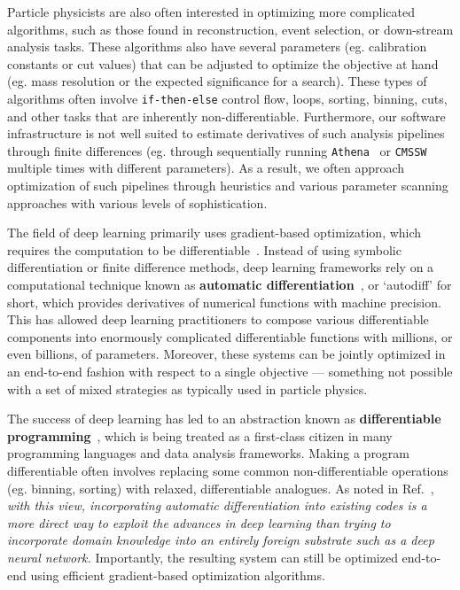 \documentclass{article}
\begin{document}
Particle physicists are also often interested in optimizing more complicated algorithms, such as those found in reconstruction, event selection, or down-stream analysis tasks. These algorithms also have several parameters (eg. calibration constants or cut values) that can be adjusted to optimize the objective at hand (eg. mass resolution or the expected significance for a search). These types of algorithms often involve \texttt{if-then-else} control flow, loops, sorting, binning, cuts, and other tasks that are inherently non-differentiable. Furthermore, our software infrastructure is not well suited to estimate derivatives of such analysis pipelines through finite differences (eg. through sequentially running \texttt{Athena}~\cite{Athena} or \texttt{CMSSW}~\cite{CMSSW} multiple times with different parameters). As a result, we often approach optimization of such pipelines  through heuristics and various parameter scanning approaches with various levels of sophistication. 

The field of deep learning primarily uses gradient-based optimization, which requires the computation to be differentiable~\cite{2015Natur.521..436L}. Instead of using symbolic differentiation or finite difference methods, deep learning frameworks rely on a computational technique known as \textbf{automatic differentiation}~\cite{baydin2018automatic}, or `autodiff' for short, which provides derivatives of numerical functions with machine precision. This has allowed deep learning practitioners to compose various differentiable components into enormously complicated differentiable functions with millions, or even billions, of parameters. Moreover, these systems can be jointly optimized in an end-to-end fashion with respect to a single objective --- something not possible with a set of mixed strategies as typically used in particle physics.

The success of deep learning has led to an abstraction known as \textbf{differentiable programming}~\cite{olah_2015,lecun_2018}, which is being treated as a first-class citizen in many programming languages and data analysis frameworks. Making a program differentiable often involves replacing some common non-differentiable operations (eg. binning, sorting) with relaxed, differentiable analogues. As noted in Ref.~\cite{Cranmer201912789}, \textit{with this view, incorporating automatic differentiation into existing codes is a more direct way to exploit the advances in deep learning than trying to incorporate domain knowledge into an entirely foreign substrate such as a deep neural network.} Importantly, the resulting system can still be optimized end-to-end using efficient gradient-based optimization algorithms. 
\end{document}
